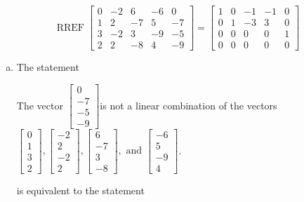 \begin{exerciseAnswer} 
\[\operatorname{RREF}  \left[\begin{array}{cccc|c}
0 & -2 & 6 & -6 & 0 \\
1 & 2 & -7 & 5 & -7 \\
3 & -2 & 3 & -9 & -5 \\
2 & 2 & -8 & 4 & -9
\end{array}\right] = \left[\begin{array}{cccc|c}
1 & 0 & -1 & -1 & 0 \\
0 & 1 & -3 & 3 & 0 \\
0 & 0 & 0 & 0 & 1 \\
0 & 0 & 0 & 0 & 0
\end{array}\right] \]
\begin{enumerate}[(a)]
\item  The statement 
\begin{center}\begin{minipage}{0.8\textwidth}
 The vector \( \left[\begin{array}{c}
0 \\
-7 \\
-5 \\
-9
\end{array}\right] \)is not a linear combination of the vectors \( \left[\begin{array}{c}
0 \\
1 \\
3 \\
2
\end{array}\right] , \left[\begin{array}{c}
-2 \\
2 \\
-2 \\
2
\end{array}\right] , \left[\begin{array}{c}
6 \\
-7 \\
3 \\
-8
\end{array}\right] , \text{ and } \left[\begin{array}{c}
-6 \\
5 \\
-9 \\
4
\end{array}\right] \). 
\end{minipage}\end{center}
     is equivalent to the statement 
\begin{center}\begin{minipage}{0.8\textwidth}

\end{minipage}
\end{center}
\end{enumerate}
\end{exerciseAnswer}
